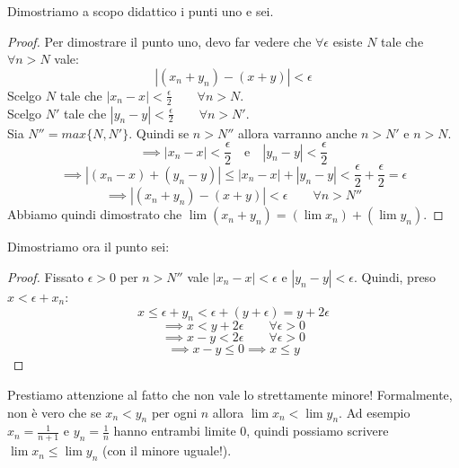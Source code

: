 Dimostriamo a scopo didattico i punti uno e sei.
\begin{proof}
Per dimostrare il punto uno, devo far vedere che $\forall \epsilon$ esiste $N$ tale che $\forall n > N$ vale:
\begin{equation*}
|(x_n + y_n) - (x+y)| < \epsilon
\end{equation*}
Scelgo $N$ tale che $|x_n-x| < \frac{\epsilon}{2} \qquad \forall n > N$. \\
Scelgo $N'$ tale che $|y_n-y| < \frac{\epsilon}{2} \qquad \forall n > N'$. \\
Sia $N'' = max\{N, N'\}$.
Quindi se $n > N''$ allora varranno anche $n > N'$ e $n > N$.
\begin{equation*}
\implies |x_n - x| < \frac{\epsilon}{2} \quad \text{e} \quad |y_n - y| < \frac{\epsilon}{2}
\end{equation*}
\begin{equation*}
\implies |(x_n-x)+(y_n-y)| \le |x_n-x|+|y_n-y| < \frac{\epsilon}{2} + \frac{\epsilon}{2} = \epsilon
\end{equation*}
\begin{equation*}
\implies |(x_n+y_n) - (x+y)| < \epsilon \qquad \forall n > N''
\end{equation*}
Abbiamo quindi dimostrato che $\lim(x_n+y_n) = (\lim x_n) + (\lim y_n)$.
\end{proof}

Dimostriamo ora il punto sei:
\begin{proof}
Fissato $\epsilon > 0$ per $n > N''$ vale $|x_n-x| < \epsilon$ e $|y_n-y| < \epsilon$.
Quindi, preso $x < \epsilon + x_n$:
\begin{equation*}
x \le \epsilon + y_n < \epsilon + (y + \epsilon) = y + 2\epsilon
\end{equation*}
\begin{equation*}
\implies x < y + 2\epsilon \qquad \forall \epsilon > 0
\end{equation*}
\begin{equation*}
\implies x - y < 2\epsilon \qquad \forall \epsilon > 0
\end{equation*}
\begin{equation*}
\implies x - y \le 0 \implies x \le y
\end{equation*}
\end{proof}

Prestiamo attenzione al fatto che non vale lo strettamente minore! Formalmente, non è vero che se $x_n < y_n$ per ogni $n$ allora $\lim x_n < \lim y_n$. Ad esempio $x_n = \frac{1}{n + 1}$ e $y_n = \frac{1}{n}$ hanno entrambi limite $0$, quindi possiamo scrivere $\lim x_n \le \lim y_n$ (con il minore uguale!).

